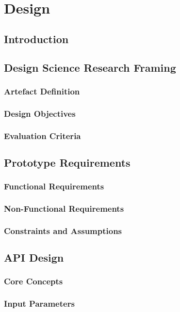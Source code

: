 \chapter{Design}

\section{Introduction}

\section{Design Science Research Framing}
\subsection{Artefact Definition}
\subsection{Design Objectives}
\subsection{Evaluation Criteria}

\section{Prototype Requirements}
\subsection{Functional Requirements}
\subsection{Non-Functional Requirements}
\subsection{Constraints and Assumptions}

\section{API Design}
\subsection{Core Concepts}
\subsection{Input Parameters}
